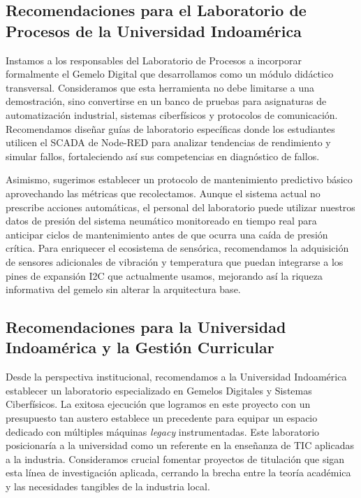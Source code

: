 \subsection{Recomendaciones para el Laboratorio de Procesos de la Universidad Indoamérica}

Instamos a los responsables del Laboratorio de Procesos a incorporar formalmente el Gemelo Digital que desarrollamos como un módulo didáctico transversal. Consideramos que esta herramienta no debe limitarse a una demostración, sino convertirse en un banco de pruebas para asignaturas de automatización industrial, sistemas ciberfísicos y protocolos de comunicación. Recomendamos diseñar guías de laboratorio específicas donde los estudiantes utilicen el SCADA de Node-RED para analizar tendencias de rendimiento y simular fallos, fortaleciendo así sus competencias en diagnóstico de fallos.

Asimismo, sugerimos establecer un protocolo de mantenimiento predictivo básico aprovechando las métricas que recolectamos. Aunque el sistema actual no prescribe acciones automáticas, el personal del laboratorio puede utilizar nuestros datos de presión del sistema neumático monitoreado en tiempo real para anticipar ciclos de mantenimiento antes de que ocurra una caída de presión crítica. Para enriquecer el ecosistema de sensórica, recomendamos la adquisición de sensores adicionales de vibración y temperatura que puedan integrarse a los pines de expansión I2C que actualmente usamos, mejorando así la riqueza informativa del gemelo sin alterar la arquitectura base.

\subsection{Recomendaciones para la Universidad Indoamérica y la Gestión Curricular}

Desde la perspectiva institucional, recomendamos a la Universidad Indoamérica establecer un laboratorio especializado en Gemelos Digitales y Sistemas Ciberfísicos. La exitosa ejecución que logramos en este proyecto con un presupuesto tan austero establece un precedente para equipar un espacio dedicado con múltiples máquinas \textit{legacy} instrumentadas. Este laboratorio posicionaría a la universidad como un referente en la enseñanza de TIC aplicadas a la industria. Consideramos crucial fomentar proyectos de titulación que sigan esta línea de investigación aplicada, cerrando la brecha entre la teoría académica y las necesidades tangibles de la industria local.

